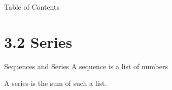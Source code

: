 

 \begin{frame}{Table of Contents }
\mapofcontentsC{\cb}
 \end{frame}

\section{3.2 Series}
\begin{frame}{Sequences and Series}
A \alert{sequence} is a list of numbers

A \alert{series} is the sum of such a list.

\end{frame}
